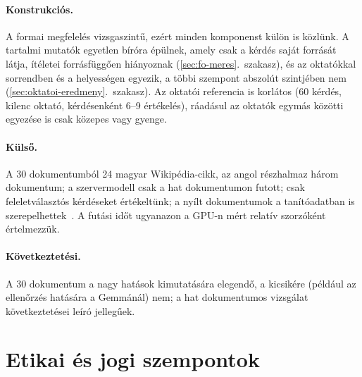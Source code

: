 \paragraph{Konstrukciós.} A formai megfelelés vizsgaszintű, ezért minden komponenst külön is közlünk. A
tartalmi mutatók egyetlen bíróra épülnek, amely csak a kérdés saját forrását látja, ítéletei forrásfüggően
hiányoznak (\ref{sec:fo-meres}.~szakasz), és az oktatókkal sorrendben és a helyességen egyezik, a többi
szempont abszolút szintjében nem (\ref{sec:oktatoi-eredmeny}.~szakasz). Az oktatói referencia is korlátos
(60 kérdés, kilenc oktató, kérdésenként 6--9 értékelés), ráadásul az oktatók egymás közötti egyezése is csak
közepes vagy gyenge.
\paragraph{Külső.} A 30 dokumentumból 24 magyar Wikipédia-cikk, az angol részhalmaz három dokumentum; a
szervermodell csak a hat dokumentumon futott; csak feleletválasztós kérdéseket értékeltünk; a nyílt
dokumentumok a tanítóadatban is szerepelhettek~\cite{sainz2023contamination}. A futási időt ugyanazon a GPU-n
mért relatív szorzóként értelmezzük.
\paragraph{Következtetési.} A 30 dokumentum a nagy hatások kimutatására elegendő, a kicsikére (például az
ellenőrzés hatására a Gemmánál) nem; a hat dokumentumos vizsgálat következtetései leíró jellegűek.

\section{Etikai és jogi szempontok}

